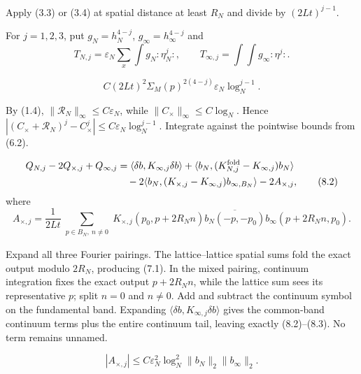 \documentclass[11pt,a4paper]{article}
\newcommand{\eps}{\varepsilon}
\begin{document}
\Because Apply (3.3) or (3.4) at spatial distance at least $R_N$ and divide by
$(2Lt)^{j-1}$.

\QedStep


For $j=1,2,3$, put $g_N=h_N^{4-j}$, $g_\infty=h_\infty^{4-j}$ and
\[
 T_{N,j}=\eps_N\sum_x\int g_N{:}\eta_N^j{:},\qquad
 T_{\infty,j}=\int\!\!\int g_\infty{:}\eta^j{:}.
\]

\[
 C(2Lt)^2\Sigma_M(p)^{2(4-j)}\eps_N\log_N^{j-1}.\tag{8.1}
\]

\Because By (1.4), $\|\mathcal R_N\|_\infty\le C\eps_N$, while
$\|C_\times\|_\infty\le C\log_N$.  Hence
$|(C_\times+\mathcal R_N)^j-C_\times^j|\le
C\eps_N\log_N^{j-1}$.  Integrate against the pointwise bounds from (6.2).

\begin{align*}
 Q_{N,j}-2Q_{\times,j}+Q_{\infty,j}
 &=\langle\delta b,K_{\infty,j}\delta b\rangle
 +\langle b_N,(K_{N,j}^{\rm fold}-K_{\infty,j})b_N\rangle\\
 &\quad-2\langle b_N,(K_{\times,j}-K_{\infty,j})b_{\infty,B_N}\rangle
 -2A_{\times,j},\tag{8.2}
\end{align*}
where
\[
 A_{\times,j}=\frac1{2Lt}\sum_{\substack{p\in B_N,\ n\ne0}}
 K_{\times,j}(p_0,p+2R_Nn)\overline{b_N(-p,-p_0)}
 b_\infty(p+2R_Nn,p_0).
\tag{8.3}
\]

\Because Expand all three Fourier pairings.  The lattice--lattice spatial sums fold
the exact output modulo $2R_N$, producing (7.1).  In the mixed pairing, continuum
integration fixes the exact output $p+2R_Nn$, while the lattice sum sees its
representative $p$; split $n=0$ and $n\ne0$.  Add and subtract the continuum symbol
on the fundamental band.  Expanding
$\langle\delta b,K_{\infty,j}\delta b\rangle$ gives the common-band continuum
terms plus the entire continuum tail, leaving exactly (8.2)--(8.3).  No term remains
unnamed.

\[
 |A_{\times,j}|\le C\eps_N^2\log_N^2
 \|b_N\|_2\|b_\infty\|_2.\tag{8.4}
\]
\end{document}
